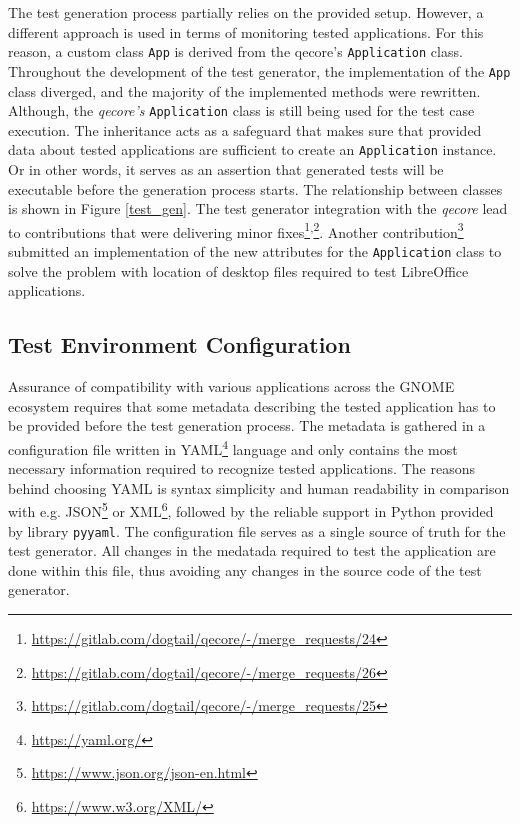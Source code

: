 The test generation process partially relies on the provided setup. However, a different approach is used in terms of monitoring tested applications. For this reason, a custom class \texttt{App} is derived from the qecore's \texttt{Application} class. Throughout the development of the test generator, the implementation of the \texttt{App} class diverged, and the majority of the implemented methods were rewritten. Although, the \textit{qecore's} \texttt{Application} class is still being used for the test case execution. The inheritance acts as a safeguard that makes sure that provided data about tested applications are sufficient to create an \texttt{Application} instance. Or in other words, it serves as an assertion that generated tests will be executable before the generation process starts. The relationship between classes is shown in Figure \ref{test_gen}. The test generator integration with the \textit{qecore} lead to contributions that were delivering minor fixes\footnote{\url{https://gitlab.com/dogtail/qecore/-/merge_requests/24}}\textsuperscript{,}\footnote{\url{https://gitlab.com/dogtail/qecore/-/merge_requests/26}}. Another contribution\footnote{\url{https://gitlab.com/dogtail/qecore/-/merge_requests/25}} submitted an implementation of the new attributes for the \texttt{Application} class to solve the problem with location of desktop files required to test LibreOffice applications.

\subsection{Test Environment Configuration}\label{env_config}
Assurance of compatibility with various applications across the GNOME ecosystem requires that some metadata describing the tested application has to be provided before the test generation process. The metadata is gathered in a configuration file written in YAML\footnote{\url{https://yaml.org/}} language and only contains the most necessary information required to recognize tested applications. The reasons behind choosing YAML is syntax simplicity and human readability in comparison with e.g. JSON\footnote{\url{https://www.json.org/json-en.html}} or XML\footnote{\url{https://www.w3.org/XML/}}, followed by the reliable support in Python provided by library \texttt{pyyaml}.\cite{yaml} The  configuration file serves as a single source of truth for the test generator. All changes in the medatada required to test the application are done within this file, thus avoiding any changes in the source code of the test generator.

